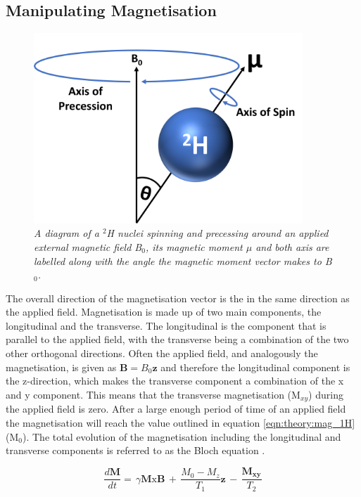 \subsection{Manipulating Magnetisation}

\begin{figure}
    \centering
    \includegraphics[width=0.9\textwidth]{Figures/Theory/Moment.png}
    \caption{\textit{A diagram of a $^2$H nuclei spinning and precessing around an applied external magnetic field B$_0$, its magnetic moment $\mu$ and both axis are labelled along with the angle the magnetic moment vector makes to B$_0$.}}
    \label{fig:theory:moment}
\end{figure}

The overall direction of the magnetisation vector is the in the same direction as the applied field. Magnetisation is made up of two main components, the longitudinal and the transverse. The longitudinal is the component that is parallel to the applied field, with the transverse being a combination of the two other orthogonal directions. Often the applied field, and analogously the magnetisation, is given as $\mathbf{B}=B_0\mathbf{z}$ and therefore the longitudinal component is the z-direction, which makes the transverse component a combination of the x and y component. This means that the transverse magnetisation (M$_{xy}$) during the applied field is zero. After a large enough period of time of an applied field the magnetisation  will reach the value outlined in equation \ref{eqn:theory:mag_1H} (M$_0$). The total evolution of the magnetisation including the longitudinal and transverse components is referred to as the Bloch equation \cite{Bloch1946NuclearInduction}.

\begin{equation}
    \frac{d\mathbf{M}}{dt} = \, \gamma\mathbf{M}\textrm{x}\mathbf{B} \, + \, \frac{M_0-M_z}{T_1}\mathbf{z} \, - \, \frac{\mathbf{M_{xy}}}{T_2}
    \label{eqn:theory:Bloch}
\end{equation}

